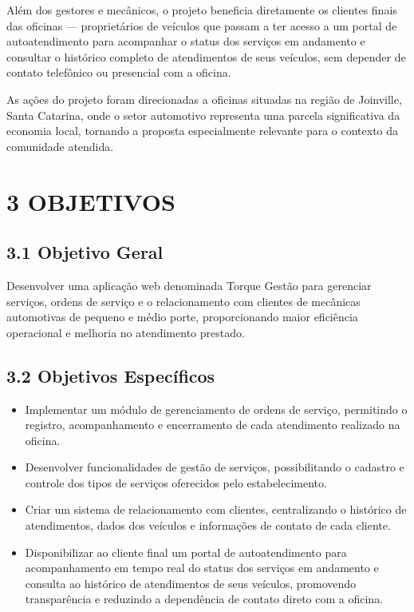 \documentclass[12pt, a4paper]{article}
\begin{document}
Al\'em dos gestores e mec\^anicos, o projeto beneficia diretamente os clientes finais das
oficinas --- propriet\'arios de ve\'iculos que passam a ter acesso a um portal de
autoatendimento para acompanhar o status dos servi\c{c}os em andamento e consultar o
hist\'orico completo de atendimentos de seus ve\'iculos, sem depender de contato telef\^onico
ou presencial com a oficina.

As a\c{c}\~oes do projeto foram direcionadas a oficinas situadas na regi\~ao de Joinville, Santa
Catarina, onde o setor automotivo representa uma parcela significativa da economia local, tornando
a proposta especialmente relevante para o contexto da comunidade atendida.
 
\newpage
{}
\label{sec:objetivos}
\section*{3 OBJETIVOS}
 
\label{sec:obj_geral}
\subsection*{3.1 Objetivo Geral}
 
Desenvolver uma aplica\c{c}\~ao web denominada Torque Gest\~ao para gerenciar servi\c{c}os,
ordens de servi\c{c}o e o relacionamento com clientes de mec\^anicas automotivas de pequeno e
m\'edio porte, proporcionando maior efici\^encia operacional e melhoria no atendimento prestado.
 
\label{sec:obj_especificos}
\subsection*{3.2 Objetivos Espec\'ificos}
 
\begin{itemize}[leftmargin=2cm, itemsep=4pt]
  \item Implementar um m\'odulo de gerenciamento de ordens de servi\c{c}o, permitindo o
        registro, acompanhamento e encerramento de cada atendimento realizado na oficina.
  \item Desenvolver funcionalidades de gest\~ao de servi\c{c}os, possibilitando o cadastro
        e controle dos tipos de servi\c{c}os oferecidos pelo estabelecimento.
  \item Criar um sistema de relacionamento com clientes, centralizando o hist\'orico de
        atendimentos, dados dos ve\'iculos e informa\c{c}\~oes de contato de cada cliente.
  \item Disponibilizar ao cliente final um portal de autoatendimento para acompanhamento
        em tempo real do status dos servi\c{c}os em andamento e consulta ao hist\'orico
        de atendimentos de seus ve\'iculos, promovendo transpar\^encia e reduzindo a
        depend\^encia de contato direto com a oficina.
\end{itemize}
 
\end{document}
